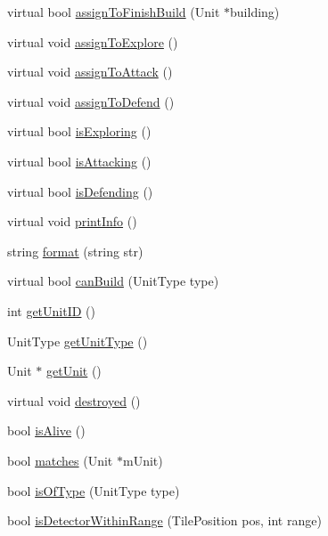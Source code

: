 \begin{DoxyCompactItemize}
virtual bool \hyperlink{class_base_agent_ad74416faba79cf2b92102246dad27b7d}{assign\-To\-Finish\-Build} (Unit $\ast$building)
\item 
virtual void \hyperlink{class_base_agent_aaea0152398078c0293016bf50d7d24ba}{assign\-To\-Explore} ()
\item 
virtual void \hyperlink{class_base_agent_a58ae08d893e41426f7e3ee17db490680}{assign\-To\-Attack} ()
\item 
virtual void \hyperlink{class_base_agent_ae2d7f49adb18aebcffdcfde56406c91d}{assign\-To\-Defend} ()
\item 
virtual bool \hyperlink{class_base_agent_aa6cb5310933d186dc968ce1fdbd670d2}{is\-Exploring} ()
\item 
virtual bool \hyperlink{class_base_agent_a389b85fe410a8ea9738524f56f9c13a1}{is\-Attacking} ()
\item 
virtual bool \hyperlink{class_base_agent_aaa15c0952be9181df51285fb87eec560}{is\-Defending} ()
\item 
virtual void \hyperlink{class_base_agent_a80433bb4a354687c5f039e90f112a197}{print\-Info} ()
\item 
string \hyperlink{class_base_agent_a08a6832834fcce26937161e0e4461a8a}{format} (string str)
\item 
virtual bool \hyperlink{class_base_agent_a750f5bd0688b6dc2133a8644f36d8cf5}{can\-Build} (Unit\-Type type)
\item 
int \hyperlink{class_base_agent_a21552b1d092a6a162443e099aee953fd}{get\-Unit\-I\-D} ()
\item 
Unit\-Type \hyperlink{class_base_agent_a1fab6cde80aa0af1bdfe41561857c9ae}{get\-Unit\-Type} ()
\item 
Unit $\ast$ \hyperlink{class_base_agent_acb7af111f08893d616c4762589c24842}{get\-Unit} ()
\item 
virtual void \hyperlink{class_base_agent_abc62bb505cb4ced4353feade1bb80e33}{destroyed} ()
\item 
bool \hyperlink{class_base_agent_a6fd9449d82a8a9a39f68c34c1b3462dd}{is\-Alive} ()
\item 
bool \hyperlink{class_base_agent_a33dea9c0e91369fd6d8d80bddbd9ac67}{matches} (Unit $\ast$m\-Unit)
\item 
bool \hyperlink{class_base_agent_aca222c58843a3b61f5ad643175a5ce45}{is\-Of\-Type} (Unit\-Type type)
\item 
bool \hyperlink{class_base_agent_a8569c74f788e3d1134032e61f93d01eb}{is\-Detector\-Within\-Range} (Tile\-Position pos, int range)
\item 

\end{DoxyCompactItemize}

